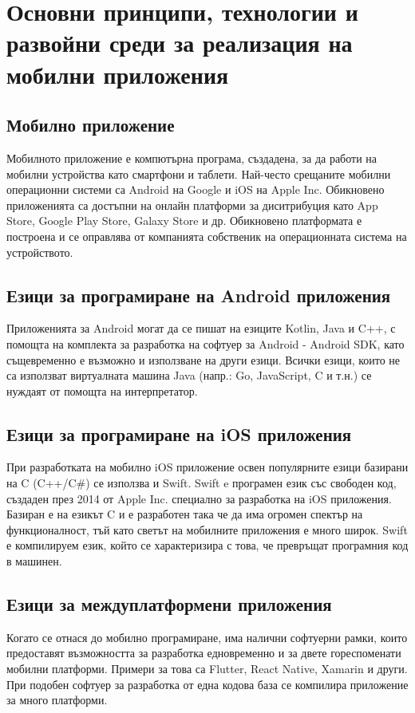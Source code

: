 \section{Основни принципи, технологии и развойни среди за реализация на мобилни приложения}
\subsection{Мобилно приложение}
Мобилното приложение е компютърна програма, създадена, за да работи на мобилни устройства като смартфони и таблети. Най-често срещаните мобилни операционни системи са Android на Google и iOS на Apple Inc. Обикновено приложенията са достъпни на онлайн платформи за диситрибуция като App Store, Google Play Store, Galaxy Store и др. Обикновено платформата е построена и се оправлява от компанията собственик на операционната система на устройството.

\subsection{Езици за програмиране на Android приложения}
Приложенията за Android могат да се пишат на езиците Kotlin, Java и C++, с помощта на комплекта за разработка на софтуер за Android - Android SDK, като същевременно е възможно и използване на други езици. Всички езици, които не са използват виртуалната машина Java (напр.: Go, JavaScript, C и т.н.) се нуждаят от помощта на интерпретатор.

\subsection{Езици за програмиране на iOS приложения}
При разработката на мобилно iOS приложение освен популярните езици базирани на C (C++/C\#) се използва и Swift. Swift e програмен език със свободен код, създаден през 2014 от Apple Inc. специално за разработка на iOS приложения. Базиран е на езикът C и е разработен така че да има огромен спектър на функционалност, тъй като светът на мобилните приложения е много широк. Swift е компилируем език, който се характеризира с това, че превръщат програмния код в машинен.

\subsection{Езици за междуплатформени приложения}
Когато се отнася до мобилно програмиране, има налични софтуерни рамки, които предоставят възможността за разработка едновременно и за двете гореспоменати мобилни платформи. Примери за това са Flutter, React Native, Xamarin и други. При подобен софтуер за разработка от една кодова база се компилира приложение за много платформи.

